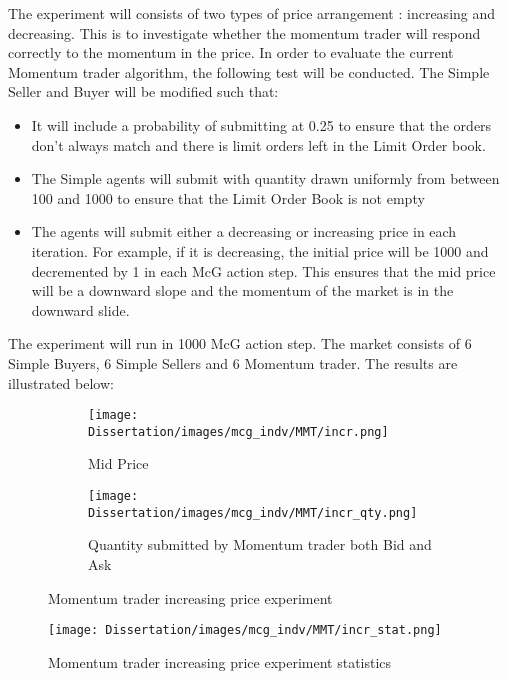 The experiment will consists of two types of price arrangement : increasing and decreasing. This is to investigate whether the momentum trader will respond correctly to the momentum in the price. In order to evaluate the current Momentum trader algorithm, the following test will be conducted. The Simple Seller and Buyer will be modified such that:
\begin{itemize}
  \item It will include a probability of submitting at 0.25 to ensure that the orders don't always match and there is limit orders left in the Limit Order book. 
  \item The Simple agents will submit with quantity drawn uniformly from between 100 and 1000 to ensure that the Limit Order Book is not empty
  \item The agents will submit either a decreasing or increasing price in each iteration. For example, if it is decreasing, the initial price will be 1000 and decremented by 1 in each McG action step. This ensures that the mid price will be a downward slope and the momentum of the market is in the downward slide. 
\end{itemize}

The experiment will run in 1000 McG action step. The market consists of 6 Simple Buyers, 6 Simple Sellers and 6 Momentum trader. The results are illustrated below: 

\begin{figure}[h]
  \begin{subfigure}[b]{0.5\textwidth}
    \texttt{[image: Dissertation/images/mcg\_indv/MMT/incr.png]}
    \caption{Mid Price}
    \label{fig:mmt_inc_midprice}
  \end{subfigure}
  \begin{subfigure}[b]{0.5\textwidth}
    \texttt{[image: Dissertation/images/mcg\_indv/MMT/incr\_qty.png]}
    \caption{Quantity submitted by Momentum trader both Bid and Ask}
    \label{fig:mmt_inc_qty}
  \end{subfigure}
\caption{Momentum trader increasing price experiment} 
\end{figure}


\begin{figure}[h]
\texttt{[image: Dissertation/images/mcg\_indv/MMT/incr\_stat.png]}
\caption{Momentum trader increasing price experiment statistics} 
\label{fig:mmt_inc_stats}
\end{figure} 
\FloatBarrier

